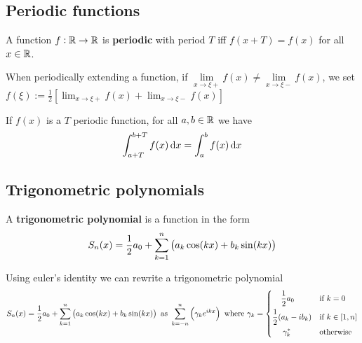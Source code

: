 \documentclass[../Year1.tex]{subfiles}
\begin{document}
\subsection{Periodic functions}

\begin{definition}
    A function $f:\mathbb{R}\rightarrow\mathbb{R}$ is \textbf{periodic} with period $T$ iff $f(x+T)=f(x)$ for all $x\in\mathbb{R}$.
\end{definition}

\begin{definition}[Discontinuity]
    When periodically extending a function, if $\lim\limits_{x\rightarrow\xi+}f(x) \neq \lim\limits_{x\rightarrow\xi-}f(x)$, we set $\displaystyle f(\xi):=\frac{1}{2}\left[\lim_{x\rightarrow\xi+}f(x) + \lim_{x\rightarrow\xi-}f(x)\right]$
\end{definition}

\begin{theorem}
    If $f(x)$ is a $T$ periodic function, for all $a,b\in\mathbb{R}$ we have \[
        \intd{a+T}{b+T}{f(x)}{x} = \intd{a}{b}{f(x)}{x}
    \]
\end{theorem}

\subsection{Trigonometric polynomials}

\begin{definition}
    A \textbf{trigonometric polynomial} is a function in the form \[
        S_n(x) = \frac{1}{2}a_0 + \sum_{k=1}^n\br{a_k\cos(kx)+b_k\sin(kx)}
    \]
\end{definition}

\begin{theorem}
    Using euler's identity we can rewrite a trigonometric polynomial \[
        S_n(x) = \frac{1}{2}a_0 + \sum_{k=1}^n\br{a_k\cos(kx)+b_k\sin(kx)} \ \text{\textcolor{black}{as }} \sum_{k=-n}^n\br{\gamma_ke^{ikx}} \ \text{\textcolor{black}{where }}
        \gamma_k = \begin{dcases}
            \hfil\frac{1}{2}a_0\hfil & \text{\textcolor{black}{if }} k=0 \\
            \frac{1}{2}(a_k-ib_k) & \text{\textcolor{black}{if }} k\in[1,n] \\
            \hfil\gamma_k^*\hfil & \text{\textcolor{black}{otherwise}} 
        \end{dcases}
    \]
\end{theorem}
\end{document}
